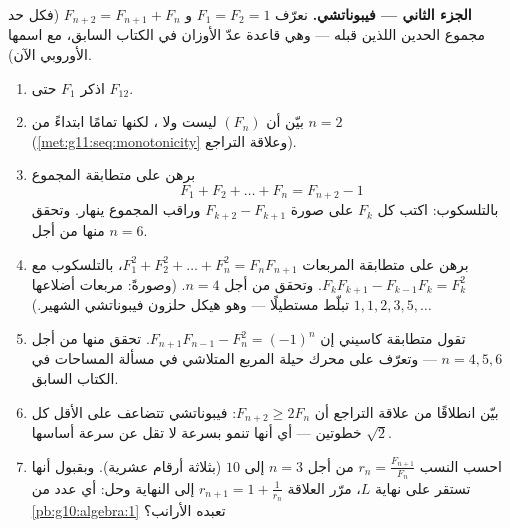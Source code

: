 \begin{problem}
\medskip
\noindent\textbf{الجزء الثاني --- فيبوناتشي.}
نعرّف $F_1 = F_2 = 1$ و $F_{n+2} = F_{n+1} + F_n$ (فكل حد
مجموع الحدين اللذين قبله --- وهي قاعدة عدّ الأوزان في
الكتاب السابق، مع اسمها الأوروبي الآن).
\begin{enumerate}[resume]
  \item اذكر $F_1$ حتى $F_{12}$.
  \item بيّن أن $(F_n)$ ليست  ولا ،
        لكنها  تمامًا ابتداءً من $n = 2$
        (\cref{met:g11:seq:monotonicity} وعلاقة التراجع).
  \item برهن على متطابقة المجموع
        \[
        F_1 + F_2 + \dots + F_n = F_{n+2} - 1
        \]
        بالتلسكوب: اكتب كل $F_k$ على صورة
        $F_{k+2} - F_{k+1}$ وراقب المجموع ينهار. وتحقق
        منها من أجل $n = 6$.
  \item برهن على متطابقة المربعات
        $F_1^2 + F_2^2 + \dots + F_n^2 = F_n F_{n+1}$،
        بالتلسكوب مع
        $F_k F_{k+1} - F_{k-1} F_k = F_k^2$. وتحقق من أجل
        $n = 4$. (وصورةً: مربعات أضلاعها
        $1, 1, 2, 3, 5, \dots$ تبلّط مستطيلًا --- وهو هيكل
        حلزون فيبوناتشي الشهير.)
  \item تقول متطابقة كاسيني إن
        $F_{n+1} F_{n-1} - F_n^2 = (-1)^n$. تحقق منها من أجل
        $n = 4, 5, 6$ --- وتعرّف على محرك حيلة
        المربع المتلاشي في مسألة المساحات في الكتاب السابق.
  \item بيّن انطلاقًا من علاقة التراجع أن
        $F_{n+2} \geq 2 F_n$:  فيبوناتشي تتضاعف على الأقل كل
        خطوتين --- أي أنها تنمو بسرعة لا تقل عن سرعة  أساسها $\sqrt2$.
  \item احسب النسب $r_n = \frac{F_{n+1}}{F_n}$ من أجل
        $n = 3$ إلى $10$ (بثلاثة أرقام عشرية). وبقبول أنها
        تستقر على نهاية $L$، مرّر العلاقة
        $r_{n+1} = 1 + \frac{1}{r_n}$ إلى النهاية وحل:
        أي عدد من \cref{pb:g10:algebra:1} تعبده الأرانب؟
\end{enumerate}


\end{problem}
